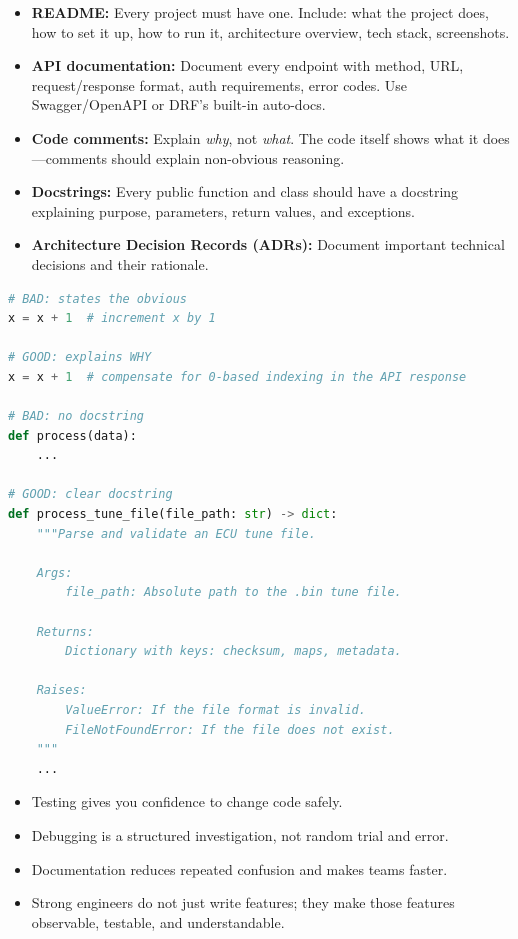 \documentclass[12pt, a4paper, oneside]{book}
\begin{document}
\begin{itemize}[leftmargin=2em]
    \item \textbf{README:} Every project must have one. Include: what the project does, how to set it up, how to run it, architecture overview, tech stack, screenshots.
    \item \textbf{API documentation:} Document every endpoint with method, URL, request/response format, auth requirements, error codes. Use Swagger/OpenAPI or DRF's built-in auto-docs.
    \item \textbf{Code comments:} Explain \emph{why}, not \emph{what}. The code itself shows what it does---comments should explain non-obvious reasoning.
    \item \textbf{Docstrings:} Every public function and class should have a docstring explaining purpose, parameters, return values, and exceptions.
    \item \textbf{Architecture Decision Records (ADRs):} Document important technical decisions and their rationale.
\end{itemize}

\begin{lstlisting}[language=Python, caption={Good vs.\,bad comments}]
# BAD: states the obvious
x = x + 1  # increment x by 1

# GOOD: explains WHY
x = x + 1  # compensate for 0-based indexing in the API response

# BAD: no docstring
def process(data):
    ...

# GOOD: clear docstring
def process_tune_file(file_path: str) -> dict:
    """Parse and validate an ECU tune file.

    Args:
        file_path: Absolute path to the .bin tune file.

    Returns:
        Dictionary with keys: checksum, maps, metadata.

    Raises:
        ValueError: If the file format is invalid.
        FileNotFoundError: If the file does not exist.
    """
    ...
\end{lstlisting}

\begin{summarybox}
\begin{itemize}[leftmargin=2em]
    \item Testing gives you confidence to change code safely.
    \item Debugging is a structured investigation, not random trial and error.
    \item Documentation reduces repeated confusion and makes teams faster.
    \item Strong engineers do not just write features; they make those features observable, testable, and understandable.
\end{itemize}
\end{summarybox}
\end{document}
